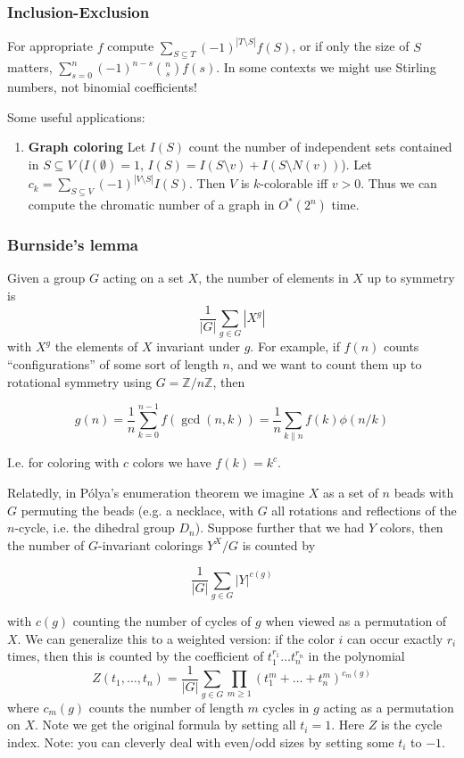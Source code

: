 \documentclass[
	a4paper,
	landscape,
	10pt,
]{article}
\begin{document}
\begin{multicols}{3}
		\subsubsection*{Inclusion-Exclusion}
		For appropriate $f$ compute $\sum_{S\subseteq T} (-1)^{|T\setminus S|} f(S)$,
		or if only the size of $S$ matters, $\sum_{s=0}^n (-1)^{n-s} \binom{n}{s}f(s)$.
		In some contexts we might use Stirling numbers, not binomial coefficients!

		Some useful applications:
		\begin{enumerate}
			\item[] \textbf{Graph coloring} Let $I(S)$ count the number
				of independent sets
				contained in $S \subseteq V$ ($I(\emptyset) = 1$,
				$I(S) = I(S\setminus v) + I(S\setminus N(v))$). Let
				$c_k = \sum_{S\subseteq V} (-1)^{|V\setminus S|} I(S)$. Then $V$
				is $k$-colorable iff $v > 0$. Thus we can compute the chromatic
				number of a graph in $O^*(2^n)$ time.
		\end{enumerate}

		\subsubsection*{Burnside's lemma}
		Given a group $G$ acting on a set $X$, the number of elements in $X$ up to
		symmetry is $$\frac{1}{|G|}\sum_{g\in G} |X^g|$$ with $X^g$ the elements of
		$X$ invariant under $g$. For example, if $f(n)$ counts ``configurations''
		of some sort of length $n$, and we want to count them up to rotational symmetry
		using $G = \mathbb{Z}/n\mathbb{Z}$, then

		$$g(n) = \frac{1}{n} \sum_{k=0}^{n-1} f(\gcd(n, k))
			= \frac{1}{n}\sum_{k \| n} f(k) \phi(n / k)$$

		I.e. for coloring with $c$ colors we have $f(k) = k^c$.

		Relatedly, in P\'olya's enumeration theorem we imagine $X$ as a set of $n$
		beads with $G$ permuting the beads (e.g. a necklace, with $G$ all rotations and
		reflections of the $n$-cycle, i.e. the dihedral group $D_n$).
		Suppose further that we had $Y$ colors, then
		the number of $G$-invariant colorings $Y^X / G$ is counted by

		$$\frac{1}{|G|}\sum_{g\in G} |Y|^{c(g)}$$

		with $c(g)$ counting the number of cycles of $g$ when viewed as a permutation
		of $X$. We can generalize this to a weighted version: if the color $i$ can
		occur exactly $r_i$ times, then this is counted by the coefficient of
		$t_1^{r_1}\dots t_n^{r_n}$ in the polynomial
		$$Z(t_1,\dots,t_n) = \frac{1}{|G|}\sum_{g\in G} \prod_{m\geq 1}
			(t_1^m+\dots+t_n^m)^{c_m(g)}$$
		where $c_m(g)$ counts the number of length $m$ cycles in $g$ acting as a
		permutation on $X$. Note we get the original formula by setting all $t_i=1$.
		Here $Z$ is the cycle index. Note: you can cleverly deal with even/odd sizes
		by setting some $t_i$ to $-1$.
		

\end{multicols}
\end{document}

